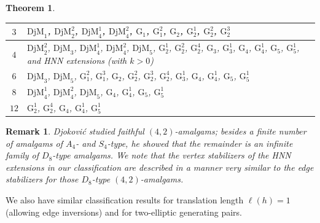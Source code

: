 \documentclass[12pt,leqno]{amsart}
\newcommand{\2}{L^2_{\rm per}(0, T)}
\newtheorem{thm}{Theorem}[section]
\newtheorem{rmk}{Remark}[section]
\numberwithin{equation}{section}
\numberwithin{figure}{section}
\begin{document}
\begin{thm}
\begin{center}
\begin{tabular}{c|p{12cm}}
            \hline
            $3$ & $\mathrm{DjM}_1$, $\mathrm{DjM}_2^2$, $\mathrm{DjM}_4^1$, $\mathrm{DjM}_4^2$, $\mathrm{G}_1$, $\mathrm{G}_1^2$, $\mathrm{G}_2$, $\mathrm{G}_2^1$, $\mathrm{G}_2^2$, $\mathrm{G}_2^3$ \\
            \hline
            $4$ & $\mathrm{DjM}_2^2$, $\mathrm{DjM}_3$, $\mathrm{DjM}_4^1$, $\mathrm{DjM}_4^2$, $\mathrm{DjM}_5$, $\mathrm{G}_2^1$, $\mathrm{G}_2^2$, $\mathrm{G}_2^4$, $\mathrm{G}_3$, $\mathrm{G}_3^1$, $\mathrm{G}_4$, $\mathrm{G}_4^1$, $\mathrm{G}_5$, $\mathrm{G}_5^1$, and HNN extensions (with $k>0$) \\
            \hline
            $6$ & $\mathrm{DjM}_3$, $\mathrm{DjM}_5$, $\mathrm{G}_1^2$, $\mathrm{G}_1^3$, $\mathrm{G}_2$, $\mathrm{G}_2^2$, $\mathrm{G}_2^3$, $\mathrm{G}_2^4$, $\mathrm{G}_3^1$, $\mathrm{G}_4$, $\mathrm{G}_4^1$, $\mathrm{G}_5$, $\mathrm{G}_5^1$ \\
            \hline
            $8$ & $\mathrm{DjM}_4^1$, $\mathrm{DjM}_4^2$, $\mathrm{DjM}_5$, $\mathrm{G}_4$, $\mathrm{G}_4^1$, $\mathrm{G}_5$, $\mathrm{G}_5^1$ \\
            \hline
            $12$ & $\mathrm{G}_2^1$, $\mathrm{G}_2^4$, $\mathrm{G}_4$, $\mathrm{G}_4^1$, $\mathrm{G}_5^1$ \\
        \end{tabular}
    \end{center}
\end{thm}
\begin{rmk}
    Djokovi\'c \cite{djokovic1980class} studied faithful $(4,2)$-amalgams; besides a finite number of amalgams of $A_4$- and $S_4$-type, he showed that the remainder is an infinite family of $D_8$-type amalgams. We note that the vertex stabilizers of the HNN extensions in our classification are described in a manner very similar to the edge stabilizers for those $D_8$-type $(4,2)$-amalgams.
\end{rmk}
We also have similar classification results for translation length $\ell(h) = 1$ (allowing edge inversions) and for two-elliptic generating pairs.
\end{document}
